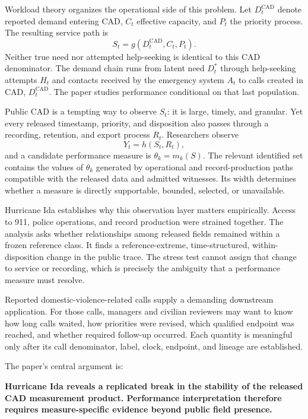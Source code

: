 \documentclass[11pt]{article}
\begin{document}
Workload theory organizes the operational side of this problem. Let $D_t^{\mathrm{CAD}}$ denote reported demand entering CAD, $C_t$ effective capacity, and $P_t$ the priority process. The resulting service path is
\begin{equation}
S_t=g(D_t^{\mathrm{CAD}},C_t,P_t).
\label{eq:workload_layer}
\end{equation}
Neither true need nor attempted help-seeking is identical to this CAD denominator. The demand chain runs from latent need $D_t^*$ through help-seeking attempts $H_t$ and contacts received by the emergency system $A_t$ to calls created in CAD, $D_t^{\mathrm{CAD}}$. The paper studies performance conditional on that last population.

Public CAD is a tempting way to observe $S_t$: it is large, timely, and granular. Yet every released timestamp, priority, and disposition also passes through a recording, retention, and export process $R_t$. Researchers observe
\begin{equation}
Y_t=h(S_t,R_t),
\label{eq:observation_layer}
\end{equation}
and a candidate performance measure is $\theta_k=m_k(S)$. The relevant identified set contains the values of $\theta_k$ generated by operational and record-production paths compatible with the released data and admitted witnesses. Its width determines whether a measure is directly supportable, bounded, selected, or unavailable.

Hurricane Ida establishes why this observation layer matters empirically. Access to 911, police operations, and record production were strained together. The analysis asks whether relationships among released fields remained within a frozen reference class. It finds a reference-extreme, time-structured, within-disposition change in the public trace. The stress test cannot assign that change to service or recording, which is precisely the ambiguity that a performance measure must resolve.

Reported domestic-violence-related calls supply a demanding downstream application. For those calls, managers and civilian reviewers may want to know how long calls waited, how priorities were revised, which qualified endpoint was reached, and whether required follow-up occurred. Each quantity is meaningful only after its call denominator, label, clock, endpoint, and lineage are established.

The paper's central argument is:

\begin{resultbox}
\textbf{Hurricane Ida reveals a replicated break in the stability of the released CAD measurement product. Performance interpretation therefore requires measure-specific evidence beyond public field presence.}
\end{resultbox}
\end{document}

